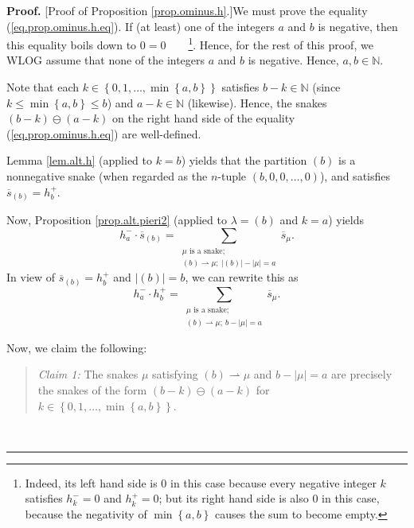 \documentclass[numbers=enddot,12pt,final,onecolumn,notitlepage]{scrartcl}%
\theoremstyle{definition}
\newenvironment{statement}{\begin{quote}}{\end{quote}}
\newenvironment{proof}[1][Proof]{\noindent\textbf{#1.} }{\ \rule{0.5em}{0.5em}}
\let\sumnonlimits\sum
\renewcommand{\sum}{\sumnonlimits\limits}
\begin{document}
\begin{proof}
[Proof of Proposition \ref{prop.ominus.h}.]We must prove the equality
(\ref{eq.prop.ominus.h.eq}). If (at least) one of the integers $a$ and $b$ is
negative, then this equality boils down to $0=0$\ \ \ \ \footnote{Indeed, its
left hand side is $0$ in this case because every negative integer $k$
satisfies $h_{k}^{-}=0$ and $h_{k}^{+}=0$; but its right hand side is also $0$
in this case, because the negativity of $\min\left\{  a,b\right\}  $ causes
the sum to become empty.}. Hence, for the rest of this proof, we WLOG assume
that none of the integers $a$ and $b$ is negative. Hence, $a,b\in\mathbb{N}$.

Note that each $k\in\left\{  0,1,\ldots,\min\left\{  a,b\right\}  \right\}  $
satisfies $b-k\in\mathbb{N}$ (since $k\leq\min\left\{  a,b\right\}  \leq b$)
and $a-k\in\mathbb{N}$ (likewise). Hence, the snakes $\left(  b-k\right)
\ominus\left(  a-k\right)  $ on the right hand side of the equality
(\ref{eq.prop.ominus.h.eq}) are well-defined.

Lemma \ref{lem.alt.h} (applied to $k=b$) yields that the partition $\left(
b\right)  $ is a nonnegative snake (when regarded as the $n$-tuple $\left(
b,0,0,\ldots,0\right)  $), and satisfies $\overline{s}_{\left(  b\right)
}=h_{b}^{+}$.

Now, Proposition \ref{prop.alt.pieri2} (applied to $\lambda=\left(  b\right)
$ and $k=a$) yields
\[
h_{a}^{-}\cdot\overline{s}_{\left(  b\right)  }=\sum_{\substack{\mu\text{ is a
snake;}\\\left(  b\right)  \rightharpoonup\mu;\ \left\vert \left(  b\right)
\right\vert -\left\vert \mu\right\vert =a}}\overline{s}_{\mu}.
\]
In view of $\overline{s}_{\left(  b\right)  }=h_{b}^{+}$ and $\left\vert
\left(  b\right)  \right\vert =b$, we can rewrite this as%
\begin{equation}
h_{a}^{-}\cdot h_{b}^{+}=\sum_{\substack{\mu\text{ is a snake;}\\\left(
b\right)  \rightharpoonup\mu;\ b-\left\vert \mu\right\vert =a}}\overline
{s}_{\mu}. \label{pf.prop.ominus.h.1}%
\end{equation}


Now, we claim the following:

\begin{statement}
\textit{Claim 1:} The snakes $\mu$ satisfying $\left(  b\right)
\rightharpoonup\mu$ and $b-\left\vert \mu\right\vert =a$ are precisely the
snakes of the form $\left(  b-k\right)  \ominus\left(  a-k\right)  $ for
$k\in\left\{  0,1,\ldots,\min\left\{  a,b\right\}  \right\}  $.
\end{statement}


\end{proof}
\end{document}
